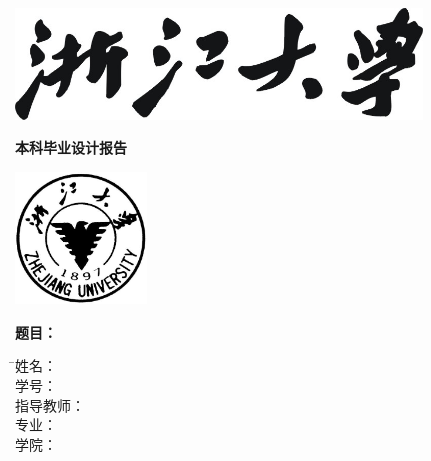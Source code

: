 
\thispagestyle{empty}

\vspace{5mm}

\begin{center}
   \includegraphics[width=108mm]{images/zjdx}
\end{center}

\centerline{\songti\erhao\textbf{本科毕业设计报告}}

\vspace{4mm}

\begin{center}
  \includegraphics[width=35mm]{images/standxb}
\end{center}

\vspace{25mm}

{\hspace{16mm}\songti\sanhao\bfseries 题目：
  \hspace{2mm} \begin{minipage}[t]{98mm}\linespread{1.1}\uline{\zjutitlec}\end{minipage}}

\vspace{7mm}

\begin{tabbing}
    \hspace{30mm} \= \songti\sihao 姓\hspace{10mm}名： \= \underline{\makebox[6cm]{\sihao\zjuauthornamec\hspace{3mm}\zjuauthorid}} \\[2mm]
    \> \songti\sihao 学\hspace{10mm}号： \> \underline{\makebox[6cm]{\sihao\zjuauthornamec\hspace{3mm}\zjuauthorid}} \\[2mm]
    \> \songti\sihao 指导教师： \> \underline{\makebox[6cm]{\sihao\zjuauthornamec\hspace{3mm}\zjuauthorid}} \\[2mm]
    \> \songti\sihao 专\hspace{10mm}业： \= \underline{\makebox[6cm]{\sihao\zjugrade\hspace{3mm}\zjumajor}} \\[2mm]
    \> \songti\sihao 学\hspace{10mm}院： \> \underline{\makebox[6cm]{\sihao\zjucollegec}}
\end{tabbing}


